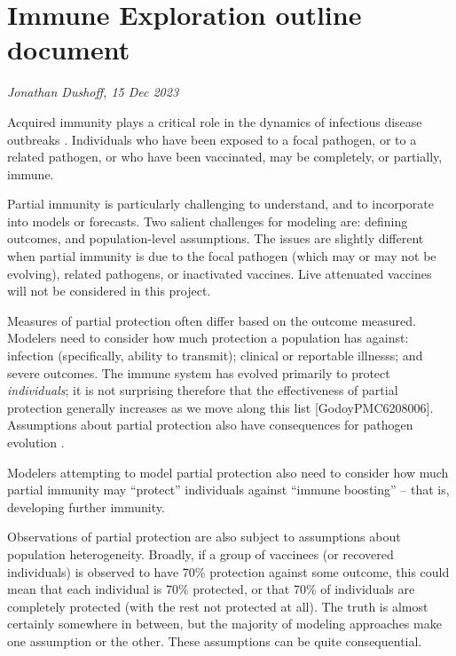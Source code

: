 \documentclass[12pt]{article}
\begin{document}
\section*{Immune Exploration outline document}

\textsl{Jonathan Dushoff, 15 Dec 2023}

\bigskip\noindent Acquired immunity plays a critical role in the dynamics of infectious disease outbreaks \cite{anderson1985vaccination}. Individuals who have been exposed to a focal pathogen, or to a related pathogen, or who have been vaccinated, may be completely, or partially, immune.

Partial immunity is particularly challenging to understand, and to incorporate into models or forecasts. Two salient challenges for modeling are: defining outcomes, and population-level assumptions. The issues are slightly different when partial immunity is due to the focal pathogen (which may or may not be evolving), related pathogens, or inactivated vaccines. Live attenuated vaccines will not be considered in this project.

Measures of partial protection often differ based on the outcome measured. Modelers need to consider how much protection a population has against: infection (specifically, ability to transmit); clinical or reportable illnesss; and severe outcomes. The immune system has evolved primarily to protect \emph{individuals}; it is not surprising therefore that the effectiveness of partial protection generally increases as we move along this list [GodoyPMC6208006]. Assumptions about partial protection also have consequences for pathogen evolution \cite{gandon2003imperfect}.

Modelers attempting to model partial protection also need to consider how much partial immunity may “protect” individuals against “immune boosting” -- that is, developing further immunity.

Observations of partial protection are also subject to assumptions about population heterogeneity. Broadly, if a group of vaccinees (or recovered individuals) is observed to have 70\% protection against some outcome, this could mean that each individual is 70\% protected, or that 70\% of individuals are completely protected (with the rest not protected at all). The truth is almost certainly somewhere in between, but the majority of modeling approaches make one assumption or the other. These assumptions can be quite consequential.
\end{document}
